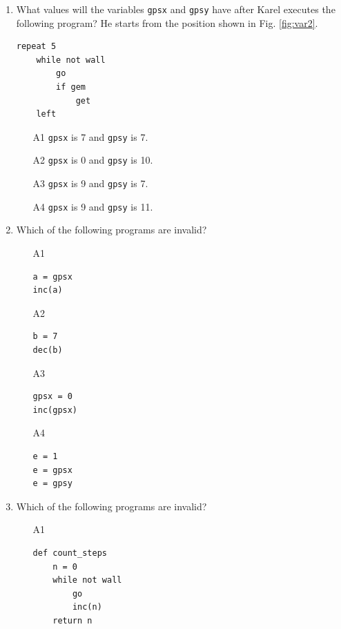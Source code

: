 {{{{\begin{enumerate}
\begin{enumerate}
\item[A1] {\tt gpsx} is 7 and {\tt gpsy} is 12.
\item[A2] {\tt gpsx} is 8 and {\tt gpsy} is 0.
\item[A3] {\tt gpsx} is 8 and {\tt gpsy} is 12.
\item[A4] {\tt gpsx} is 7 and {\tt gpsy} is 11.
\end{enumerate}
\item What values will the variables {\tt gpsx} and {\tt gpsy} have after
Karel executes the following program? He starts from the position shown 
in Fig. \ref{fig:var2}.
\begin{verbatim}
repeat 5
    while not wall
        go
        if gem
            get
    left
\end{verbatim}
\begin{enumerate}
\item[A1] {\tt gpsx} is 7 and {\tt gpsy} is 7.
\item[A2] {\tt gpsx} is 0 and {\tt gpsy} is 10.
\item[A3] {\tt gpsx} is 9 and {\tt gpsy} is 7.
\item[A4] {\tt gpsx} is 9 and {\tt gpsy} is 11.
\end{enumerate}
\item Which of the following programs are invalid?
\begin{enumerate}
\item[A1] 
\begin{verbatim}
a = gpsx
inc(a)
\end{verbatim}
\item[A2] 
\begin{verbatim}
b = 7
dec(b)
\end{verbatim}
\item[A3] 
\begin{verbatim}
gpsx = 0
inc(gpsx)
\end{verbatim}
\item[A4] 
\begin{verbatim}
e = 1
e = gpsx
e = gpsy
\end{verbatim}
\end{enumerate}
\item Which of the following programs are invalid?
\begin{enumerate}
\item[A1] 
\begin{verbatim}
def count_steps
    n = 0
    while not wall
        go
        inc(n)
    return n

\end{verbatim}
\end{enumerate}
\end{enumerate}}}}}
